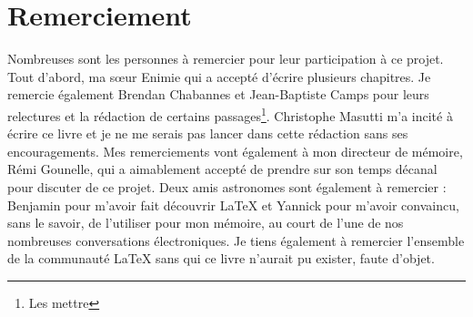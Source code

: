 \section{Remerciement}

Nombreuses sont les personnes à remercier pour leur participation à ce projet. Tout d'abord, ma sœur Enimie qui a accepté d'écrire plusieurs chapitres. Je remercie également Brendan Chabannes et Jean-Baptiste Camps pour leurs relectures et la rédaction de certains passages\footnote{Les mettre}.
Christophe Masutti m'a incité à écrire ce livre et je ne me serais pas lancer dans cette rédaction sans ses encouragements. Mes remerciements vont également à mon directeur de mémoire, Rémi Gounelle, qui a aimablement accepté de prendre sur son temps décanal pour discuter de ce projet.
Deux amis astronomes sont également à remercier : Benjamin pour m'avoir fait découvrir  LaTeX et Yannick pour m'avoir convaincu, sans le savoir, de l'utiliser pour mon mémoire, au court de l'une de nos nombreuses conversations électroniques.
Je tiens également à remercier l'ensemble de la communauté \LaTeX{} sans qui ce livre n'aurait pu exister, faute d'objet.
 

